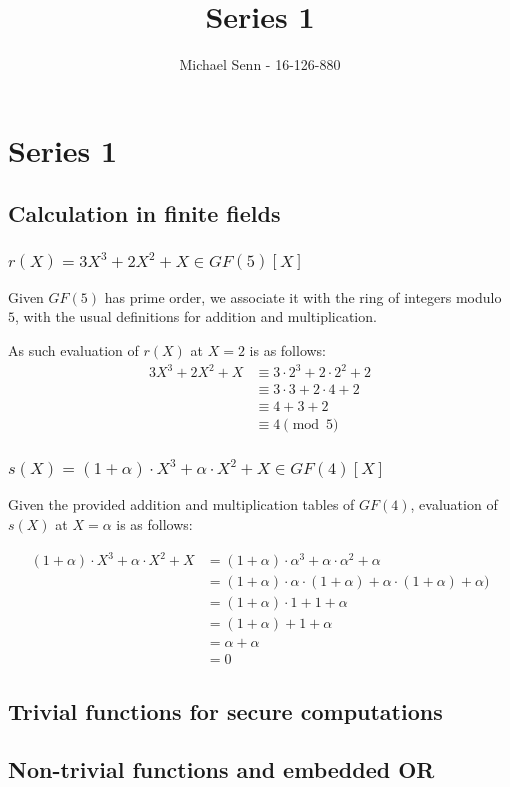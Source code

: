 \documentclass[a4paper]{scrreprt}
\title{Series 1}
\author{Michael Senn \maillink{michael.senn@students.unibe.ch} - 16-126-880}
\date{\printdate}
\begin{document}
\maketitle


\setcounter{chapter}{0}

\chapter{Series 1}

\section{Calculation in finite fields}

\subsection{$r(X) = 3X^3 + 2X^2 + X \in GF(5)[X]$}

Given $GF(5)$ has prime order, we associate it with the ring of integers modulo
$5$, with the usual definitions for addition and multiplication.

As such evaluation of $r(X)$ at $X = 2$ is as follows:
\begin{align*}
		3X^3 + 2X^2 + X & \equiv 3 \cdot 2^3 + 2 \cdot 2^2 + 2 \\
						& \equiv 3 \cdot 3 + 2 \cdot 4 + 2 \\
						& \equiv 4 + 3 + 2 \\
						& \equiv 4 \pmod 5
\end{align*}

\subsection{$s(X) = (1 + \alpha) \cdot X^3 + \alpha \cdot X^2 + X \in GF(4)[X]$}

Given the provided addition and multiplication tables of $GF(4)$, evaluation of
$s(X)$ at $X = \alpha$ is as follows:

\begin{align*}
		(1 + \alpha) \cdot X^3 + \alpha \cdot X^2 + X & = (1 + \alpha) \cdot \alpha^3 + \alpha \cdot \alpha^2 + \alpha \\
													  & = (1 + \alpha) \cdot \alpha \cdot (1 + \alpha) + \alpha \cdot (1 + \alpha) + \alpha) \\
													  & = (1 + \alpha) \cdot 1 + 1 + \alpha \\
													  & = (1 + \alpha) + 1 + \alpha \\
													  & = \alpha + \alpha \\
													  & = 0
\end{align*}


\section{Trivial functions for secure computations}

\section{Non-trivial functions and embedded OR}
\end{document}
